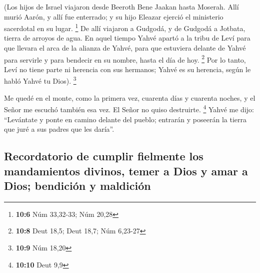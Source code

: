  (Los hijos de Israel viajaron desde Beeroth Bene Jaakan
hasta Moserah. Allí murió Aarón, y allí fue enterrado; y su hijo Eleazar
ejerció el ministerio sacerdotal en su lugar. \footnote{\textbf{10:6}
  Núm 33,32-33; Núm 20,28}  De allí viajaron a Gudgodá, y
de Gudgodá a Jotbata, tierra de arroyos de agua.  En aquel
tiempo Yahvé apartó a la tribu de Leví para que llevara el arca de la
alianza de Yahvé, para que estuviera delante de Yahvé para servirle y
para bendecir en su nombre, hasta el día de hoy. \footnote{\textbf{10:8}
  Deut 18,5; Deut 18,7; Núm 6,23-27}  Por lo tanto, Leví
no tiene parte ni herencia con sus hermanos; Yahvé es su herencia, según
le habló Yahvé tu Dios). \footnote{\textbf{10:9} Núm 18,20}

 Me quedé en el monte, como la primera vez, cuarenta días
y cuarenta noches, y el Señor me escuchó también esa vez. El Señor no
quiso destruirte. \footnote{\textbf{10:10} Deut 9,9} 
Yahvé me dijo: ``Levántate y ponte en camino delante del pueblo;
entrarán y poseerán la tierra que juré a sus padres que les daría''.

\hypertarget{recordatorio-de-cumplir-fielmente-los-mandamientos-divinos-temer-a-dios-y-amar-a-dios-bendiciuxf3n-y-maldiciuxf3n}{%
\subsection{Recordatorio de cumplir fielmente los mandamientos divinos,
temer a Dios y amar a Dios; bendición y
maldición}\label{recordatorio-de-cumplir-fielmente-los-mandamientos-divinos-temer-a-dios-y-amar-a-dios-bendiciuxf3n-y-maldiciuxf3n}}

